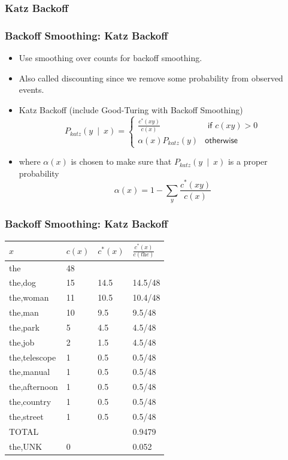 \documentclass{beamer}
\begin{document}
\subsubsection{Katz Backoff}

\begin{frame}
\frametitle{Backoff Smoothing: Katz Backoff}
\begin{itemize}[<+->]
\item Use smoothing over counts for backoff smoothing.
\item Also called discounting since we remove some probability from observed events.
\item Katz Backoff (include Good-Turing with Backoff Smoothing)
\[ P_{\textit{katz}}(y~\mid~x) = \left\{ 
\begin{array}{cc}
\frac{ c^\ast(xy) }{ c(x) } & \textsf{ if $c(xy) > 0$} \\
\alpha(x) P_{\textit{katz}} (y) & \textsf{otherwise}
\end{array}
\right. \]
\item where $\alpha(x)$ is chosen to make sure that $P_{\textit{katz}}(y~\mid~x)$ is a proper probability
\[ \alpha(x) = 1 - \sum_y \frac{ c^\ast(xy) }{ c(x) } \]
\end{itemize}
\end{frame}

\begin{frame}
\frametitle{Backoff Smoothing: Katz Backoff}
\begin{center}
\begin{tabular}{ | l | l | l | l | }
\hline
$x$ & $c(x)$ & $c^\ast(x)$ & $\frac{c^\ast(x)}{c(\textit{the})}$ \\
\hline
the & 48 & & \\
the,dog & 15 & 14.5 & 14.5/48 \\
the,woman & 11 & 10.5 & 10.4/48 \\
the,man & 10 & 9.5 & 9.5/48 \\
the,park & 5 & 4.5 & 4.5/48 \\
the,job & 2 & 1.5 & 4.5/48 \\
the,telescope & 1 & 0.5 & 0.5/48 \\
the,manual & 1 & 0.5 & 0.5/48 \\
the,afternoon & 1 & 0.5 & 0.5/48 \\
the,country & 1 & 0.5 & 0.5/48 \\
the,street & 1 & 0.5 & 0.5/48 \\
\hline
TOTAL & & & 0.9479 \\
\hline
the,UNK & 0 & & 0.052 \\
\hline
\end{tabular}
\end{center}
\end{frame}
\end{document}
